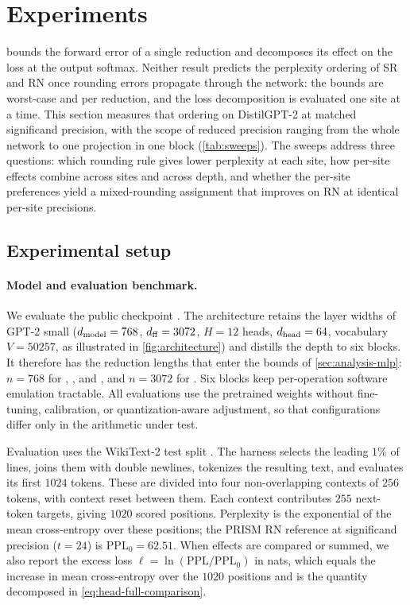 \section{Experiments}
\label{sec:experiments}

 bounds the forward error of a single reduction and
decomposes its effect on the loss at the output softmax. Neither result
predicts the perplexity ordering of SR and RN once rounding errors propagate
through the network: the bounds are worst-case and per reduction, and the loss
decomposition is evaluated one site at a time. This section measures that
ordering on DistilGPT-2 at matched significand precision, with the scope of
reduced precision ranging from the whole network to one projection in one block
(\cref{tab:sweeps}). The sweeps address three questions: which rounding rule
gives lower perplexity at each site, how per-site effects combine across sites
and across depth, and whether the per-site preferences yield a mixed-rounding
assignment that improves on RN at identical per-site precisions.

\subsection{Experimental setup}
\label{sec:exp-setup}

\paragraph{Model and evaluation benchmark.}
We evaluate the public  checkpoint
\citep{distilgpt2modelcard,wolf2020transformers}. The architecture retains the
layer widths of GPT-2 small ($d_{\rm model} = 768$, $d_{\rm ff} = 3072$, $H =
  12$ heads, $d_{\rm head} = 64$, vocabulary $V = 50257$, as illustrated in
\cref{fig:architecture}) and distills the depth to six blocks. It therefore has
the reduction lengths that enter the bounds of \cref{sec:analysis-mlp}:
$n=768$ for , , and ,
and $n=3072$ for . Six blocks keep per-operation software
emulation tractable. All evaluations use the pretrained weights without
fine-tuning, calibration, or quantization-aware adjustment, so that
configurations differ only in the arithmetic under test.

Evaluation uses the WikiText-2 test split \citep{merity2017pointer}. The harness
selects the leading $1\%$ of lines, joins them with double newlines, tokenizes
the resulting text, and evaluates its first $1024$ tokens. These are divided
into four non-overlapping contexts of $256$ tokens, with context reset between
them. Each context contributes $255$ next-token targets, giving $1020$ scored
positions. Perplexity is the exponential of the mean cross-entropy over these
positions; the PRISM RN reference at  significand precision
($t=24$) is $\mathrm{PPL}_0 = 62.51$. When effects are compared or summed, we
also report the excess loss $\ell = \ln(\mathrm{PPL}/\mathrm{PPL}_0)$ in nats,
which equals the increase in mean cross-entropy over the $1020$ positions and is
the quantity decomposed in \cref{eq:head-full-comparison}.

